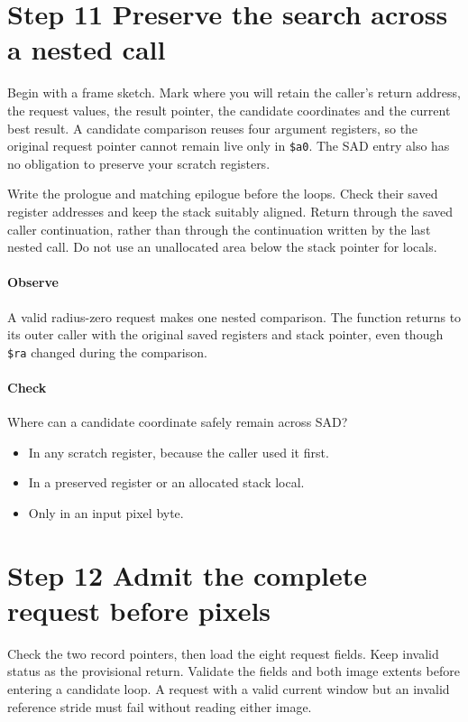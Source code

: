 \section{Step 11 Preserve the search across a nested call}\label{h263-motion-s01}
Begin with a frame sketch. Mark where you will retain the caller's return address,
the request values, the result pointer, the candidate coordinates and the current
best result. A candidate comparison reuses four argument registers, so the
original request pointer cannot remain live only in \texttt{\$a0}. The SAD entry
also has no obligation to preserve your scratch registers.

Write the prologue and matching epilogue before the loops. Check their saved
register addresses and keep the stack suitably aligned. Return through the saved
caller continuation, rather than through the continuation written by the last
nested call. Do not use an unallocated area below the stack pointer for locals.

\paragraph{Observe} A valid radius-zero request makes one nested comparison.
The function returns to its outer caller with the original saved registers and
stack pointer, even though \texttt{\$ra} changed during the comparison.
\paragraph{Check} Where can a candidate coordinate safely remain across SAD?
\begin{itemize}
  \item[A.] In any scratch register, because the caller used it first.
  \item[B.] In a preserved register or an allocated stack local.
  \item[C.] Only in an input pixel byte.
\end{itemize}

\section{Step 12 Admit the complete request before pixels}\label{h263-motion-s02}
Check the two record pointers, then load the eight request fields. Keep invalid
status as the provisional return. Validate the fields and both image extents
before entering a candidate loop. A request with a valid current window but an
invalid reference stride must fail without reading either image.

